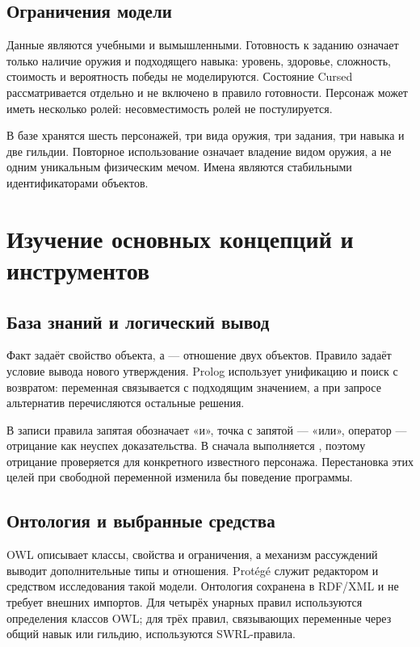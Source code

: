\subsection{Ограничения модели}
Данные являются учебными и вымышленными. Готовность к заданию означает только наличие оружия и подходящего навыка: уровень, здоровье, сложность, стоимость и вероятность победы не моделируются. Состояние Cursed рассматривается отдельно и не включено в правило готовности. Персонаж может иметь несколько ролей: несовместимость ролей не постулируется.

В базе хранятся шесть персонажей, три вида оружия, три задания, три навыка и две гильдии. Повторное использование  означает владение видом оружия, а не одним уникальным физическим мечом. Имена являются стабильными идентификаторами объектов.

\section{Изучение основных концепций и инструментов}
\subsection{База знаний и логический вывод}
Факт  задаёт свойство объекта, а  --- отношение двух объектов. Правило задаёт условие вывода нового утверждения. Prolog использует унификацию и поиск с возвратом: переменная связывается с подходящим значением, а при запросе альтернатив перечисляются остальные решения.

В записи правила запятая обозначает «и», точка с запятой --- «или», оператор \code{\+} --- отрицание как неуспех доказательства. В  сначала выполняется , поэтому отрицание проверяется для конкретного известного персонажа. Перестановка этих целей при свободной переменной изменила бы поведение программы.

\subsection{Онтология и выбранные средства}
OWL описывает классы, свойства и ограничения, а механизм рассуждений выводит дополнительные типы и отношения. Protégé служит редактором и средством исследования такой модели. Онтология сохранена в RDF/XML и не требует внешних импортов. Для четырёх унарных правил используются определения классов OWL; для трёх правил, связывающих переменные через общий навык или гильдию, используются SWRL-правила.

